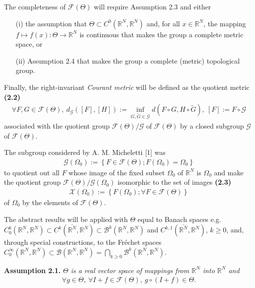 \documentclass{book}
\numberwithin{equation}{section}
\begin{document}
\begin{enumerate}
    The completeness of $\mathcal{F}(\Theta)$ will require Assumption 2.3 and either
    \begin{itemize}
        \item[(i)] the assumption that $\Theta\subset C^0(\mathbb{R}^N,\mathbb{R}^N)$ and, for all $x\in\mathbb{R}^N$, the mapping $f\mapsto f(x):\Theta\to\mathbb{R}^N$ is continuous that makes the group a complete metric space, or
        \item[(ii)] Assumption 2.4 that makes the group a complete (metric) topological group.
    \end{itemize}
    Finally, the right-invariant \textit{Courant metric} will be defined as the quotient metric \textbf{(2.2)}
    \begin{align*}
        \forall F,G\in\mathcal{F}(\Theta),\ d_{\mathcal{G}}\left([F],[H]\right) := \inf_{G,\widetilde{G}\in\mathcal{G}} d\left(F\circ G,H\circ\widetilde{G}\right),\ [F] := F\circ\mathcal{G}
    \end{align*}
    associated with the quotient group $\mathcal{F}(\Theta)/\mathcal{G}$ of $\mathcal{F}(\Theta)$ by a closed subgroup $\mathcal{G}$ of $\mathcal{F}(\Theta)$.
    
    The subgroup considered by A. M. Micheletti [1] was
    \begin{align*}
        \mathcal{G}(\Omega_0) := \left\{F\in\mathcal{F}(\Theta);F(\Omega_0) = \Omega_0\right\}
    \end{align*}
    to quotient out all $F$ whose image of the fixed subset $\Omega_0$ of $\mathbb{R}^N$ is $\Omega_0$ and make the quotient group $\mathcal{F}(\Theta)/\mathcal{G}(\Omega_0)$ isomorphic to the set of images \textbf{(2.3)}
    \begin{align*}
        \mathcal{X}(\Omega_0) := \left\{F(\Omega_0);\forall F\in\mathcal{F}(\Theta)\right\}
    \end{align*}
    of $\Omega_0$ by the elements of $\mathcal{F}(\Theta)$.
    
    The abstract results will be applied with $\Theta$ equal to Banach spaces e.g. $C_0^k(\mathbb{R}^N,\mathbb{R}^N)\subset C^k(\overline{\mathbb{R}^N},\mathbb{R}^N)\subset\mathcal{B}^k(\mathbb{R}^N,\mathbb{R}^N)$ and $C^{k,1}(\overline{\mathbb{R}^N},\mathbb{R}^N)$, $k\ge 0$, and, through special constructions, to the Fréchet spaces $C_0^\infty(\mathbb{R}^N,\mathbb{R}^N)\subset\mathcal{B}(\mathbb{R}^N,\mathbb{R}^N) = \bigcap_{k\ge 0} \mathcal{B}^k(\mathbb{R}^N,\mathbb{R}^N)$.
    
    \textbf{Assumption 2.1.} \textit{$\Theta$ is a real vector space of mappings from $\mathbb{R}^N$ into $\mathbb{R}^N$ and}
    \begin{align*}
        \forall g\in\Theta,\ \forall I + f\in\mathcal{F}(\Theta),\ g\circ(I + 
        f)\in\Theta.
    \end{align*}
    

\end{enumerate}
\end{document}
